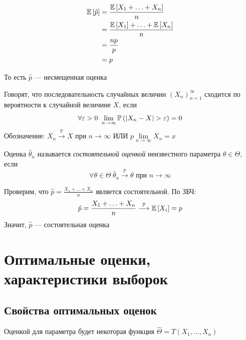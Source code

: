 \documentclass[a4paper, 10pt]{article}
\begin{document}
\begin{equation*}
    \begin{aligned}
        \mathbb{E}\left[\hat{p}\right]&=\frac{\mathbb{E}\left[X_1+\ldots+X_n\right]}{n}\\
        &=\frac{\mathbb{E}\left[X_1\right]+\ldots+\mathbb{E}\left[X_n\right]}{n}\\
        &=\frac{np}{p}\\
        &=p
    \end{aligned}
\end{equation*}

То есть $\hat{p}$ — несмещенная оценка

 Говорят, что последовательность случайных величин $(X_n)_{n=1}^{\infty}$ сходится по вероятности к случайной величине $X$, если
\begin{equation*}
    \forall \varepsilon>0\ \lim\limits_{n\to\infty}\prob{|X_n-X|>\varepsilon}=0
\end{equation*}
Обозначение: $X_n\overset{\mathbb{P}}{\longrightarrow}X$ при $n\to\infty$ ИЛИ $p\lim\limits_{n\to\infty} X_n=x$

 Оценка $\hat{\theta}_n$ называется \textit{состоятельной оценкой} неизвестного параметра $\theta\in\Theta$, если
\begin{equation*}
    \forall \theta\in\Theta\ \hat{\theta}_n\overset{\mathbb{P}}{\longrightarrow}\theta\text{ при }n\to\infty
\end{equation*}

\ex Проверим, что $\hat{p}=\displaystyle\frac{X_1+\ldots+X_n}{n}$ является состоятельной. По ЗБЧ:
\begin{equation*}
    \begin{aligned}
        \hat{p}=\displaystyle\frac{X_1+\ldots+X_n}{n}\overset{\mathbb{P}}{\longrightarrow}\mathbb{E}\left[X_i\right]=p
    \end{aligned}
\end{equation*}
Значит, $\hat{p}$ — состоятельная оценка

\newpage
\section{Оптимальные оценки, характеристики выборок}
\subsection{Свойства оптимальных оценок}
 Оценкой для параметра будет некоторая функция $\hat{\Theta}=T(X_1,\ldots,X_n)$
\end{document}
